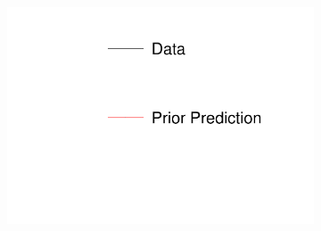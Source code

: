 \begin{figure}[!h]
\centering
\begin{subfigure}{.24\textwidth}
  \centering
  \includegraphics[width=\linewidth, clip]{figs/prioronly1dleg.pdf}
\end{subfigure}


\end{figure}
